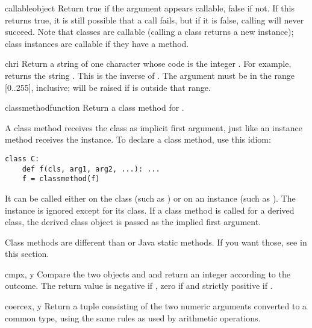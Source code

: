 \begin{funcdesc}{callable}{object}
  Return true if the  argument appears callable, false if
  not.  If this returns true, it is still possible that a call fails,
  but if it is false, calling  will never succeed.  Note
  that classes are callable (calling a class returns a new instance);
  class instances are callable if they have a 
  method.
\end{funcdesc}

\begin{funcdesc}{chr}{i}
  Return a string of one character whose \ASCII{} code is the integer
  .  For example,  returns the string .
  This is the inverse of .  The argument must be in
  the range [0..255], inclusive;  will be raised
  if  is outside that range.
\end{funcdesc}

\begin{funcdesc}{classmethod}{function}
  Return a class method for .

  A class method receives the class as implicit first argument,
  just like an instance method receives the instance.
  To declare a class method, use this idiom:

\begin{verbatim}
class C:
    def f(cls, arg1, arg2, ...): ...
    f = classmethod(f)
\end{verbatim}

  It can be called either on the class (such as ) or on an
  instance (such as ).  The instance is ignored except for
  its class.
  If a class method is called for a derived class, the derived class
  object is passed as the implied first argument.

  Class methods are different than \Cpp{} or Java static methods.
  If you want those, see  in this section.
\end{funcdesc}

\begin{funcdesc}{cmp}{x, y}
  Compare the two objects  and  and return an integer
  according to the outcome.  The return value is negative if , zero if  and strictly positive if
  .
\end{funcdesc}

\begin{funcdesc}{coerce}{x, y}
  Return a tuple consisting of the two numeric arguments converted to
  a common type, using the same rules as used by arithmetic
  operations.
\end{funcdesc}

